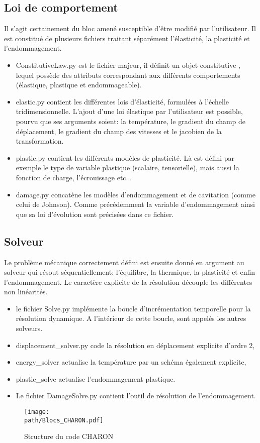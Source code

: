\documentclass[10pt]{book}
\def\path{./fig}
\begin{document}
\subsection{Loi de comportement}\label{Subsection:Charon Loi de comportement}
Il s'agit certainement du bloc amené susceptible d'être modifié par l'utilisateur. Il est constitué de plusieurs fichiers traitant séparément l'élasticité, la plasticité et l'endommagement.
\begin{itemize}
\item ConstitutiveLaw.py est le fichier majeur, il définit un objet \og constitutive \fg{}, lequel possède des attributs correspondant aux différents comportements (élastique, plastique et endommageable).
\item elastic.py contient les différentes lois d'élasticité, formulées à l'échelle tridimensionnelle. L'ajout d'une loi élastique par l'utilisateur est possible, pourvu que ses arguments soient: la température, le gradient du champ de déplacement, le gradient du champ des vitesses et le jacobien de la transformation.
\item plastic.py contient les différents modèles de plasticité. Là est défini par exemple le type de variable plastique (scalaire, tensorielle), mais aussi la fonction de charge, l'écrouissage etc...
\item damage.py concatène les modèles d'endommagement et de cavitation (comme celui de Johnson). Comme précédemment la variable d'endommagement ainsi que sa loi d'évolution sont précisées dans ce fichier.
\end{itemize}
\subsection{Solveur}\label{Subsection:Charon Solveur}
Le problème mécanique correctement défini est ensuite donné en argument au solveur qui résout séquentiellement: l'équilibre, la thermique, la plasticité et enfin l'endommagement. Le caractère explicite de la résolution découple les différentes non linéarités.
\begin{itemize}
\item le fichier Solve.py implémente la boucle d'incrémentation temporelle pour la résolution dynamique. A l'intérieur de cette boucle, sont appelés les autres solveurs.
\item displacement\_solver.py code la résolution en déplacement explicite d'ordre 2,
\item energy\_solver actualise la température par un schéma également explicite,
\item plastic\_solve actualise l'endommagement plastique.
\item Le fichier DamageSolve.py contient l'outil de résolution de l'endommagement. 
\end{itemize}
\clearpage
\begin{figure}[h!]\centering\texttt{[image: \\path/Blocs\_CHARON.pdf]}
\caption{Structure du code CHARON}
\label{fig:Structure_code_CHARON}
\end{figure}
\end{document}
